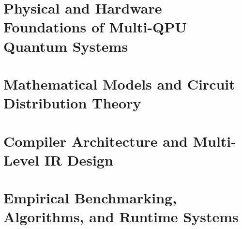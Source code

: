 \documentclass[11pt,twoside,openany,a4paper]{book}
\begin{document}
\frontmatter







\tableofcontents
\listoffigures
\listoftables

\mainmatter

\part{Physical and Hardware Foundations of Multi-QPU Quantum Systems}




\part{Mathematical Models and Circuit Distribution Theory}




\part{Compiler Architecture and Multi-Level IR Design}




\part{Empirical Benchmarking, Algorithms, and Runtime Systems}



\end{document}
